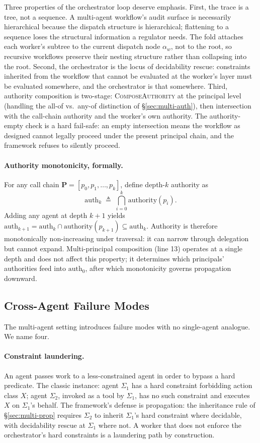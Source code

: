 \documentclass[11pt,a4paper]{article}
\theoremstyle{remark}
\begin{document}
Three properties of the orchestrator loop deserve emphasis. First, the trace is a tree, not a sequence. A multi-agent workflow's audit surface is necessarily hierarchical because the dispatch structure is hierarchical; flattening to a sequence loses the structural information a regulator needs. The fold attaches each worker's subtree to the current dispatch node $\alpha_w$, not to the root, so recursive workflows preserve their nesting structure rather than collapsing into the root. Second, the orchestrator is the locus of decidability rescue: constraints inherited from the workflow that cannot be evaluated at the worker's layer must be evaluated somewhere, and the orchestrator is that somewhere. Third, authority composition is two-stage: \textsc{ComposeAuthority} at the principal level (handling the all-of vs.\ any-of distinction of \S\ref{sec:multi-auth}), then intersection with the call-chain authority and the worker's own authority. The authority-empty check is a hard fail-safe: an empty intersection means the workflow as designed cannot legally proceed under the present principal chain, and the framework refuses to silently proceed.

\paragraph{Authority monotonicity, formally.} For any call chain $\mathbf{P} = [p_0, p_1, \ldots, p_k]$, define depth-$k$ authority as
\[
    \text{auth}_k \;\triangleq\; \bigcap_{i=0}^{k} \text{authority}(p_i).
\]
Adding any agent at depth $k+1$ yields $\text{auth}_{k+1} = \text{auth}_k \cap \text{authority}(p_{k+1}) \subseteq \text{auth}_k$. Authority is therefore monotonically non-increasing under traversal: it can narrow through delegation but cannot expand. Multi-principal composition (line 13) operates at a single depth and does not affect this property; it determines which principals' authorities feed into $\text{auth}_0$, after which monotonicity governs propagation downward.

\subsection{Cross-Agent Failure Modes}\label{sec:multi-failure}

The multi-agent setting introduces failure modes with no single-agent analogue. We name four.

\paragraph{Constraint laundering.} An agent passes work to a less-constrained agent in order to bypass a hard predicate. The classic instance: agent $\Sigma_1$ has a hard constraint forbidding action class $X$; agent $\Sigma_2$, invoked as a tool by $\Sigma_1$, has no such constraint and executes $X$ on $\Sigma_1$'s behalf. The framework's defense is propagation: the inheritance rule of \S\ref{sec:multi-prop} requires $\Sigma_2$ to inherit $\Sigma_1$'s hard constraint where decidable, with decidability rescue at $\Sigma_1$ where not. A worker that does not enforce the orchestrator's hard constraints is a laundering path by construction.
\end{document}
